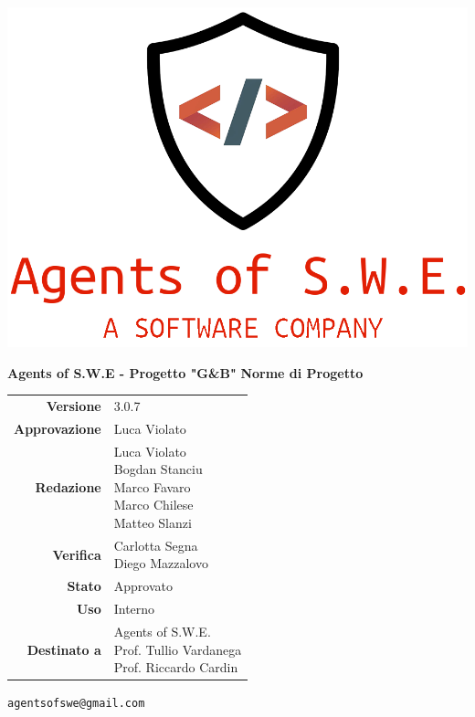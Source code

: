 


\begin{titlepage}
\thispagestyle{empty}

\begin{center}
\includegraphics[scale=0.3]{./images/logo.png} 

\large \textbf{Agents of S.W.E - Progetto "G\&B"}
\vfill
\Huge \textbf{Norme di Progetto}
\vfill
\large
\renewcommand{\arraystretch}{1.3}
\begin{tabular}{r|l}

\textbf{Versione} & 3.0.7\\

\textbf{Approvazione} & Luca Violato\\
\textbf{Redazione} & \parbox[t]{5cm}{Luca Violato\\Bogdan Stanciu\\Marco Favaro\\Marco Chilese \\ Matteo Slanzi}\\\
\textbf{Verifica} & \parbox[t]{5cm}{Carlotta Segna \\ Diego Mazzalovo}\\
\textbf{Stato} & Approvato\\
\textbf{Uso} & Interno\\
\textbf{Destinato a} & \parbox[t]{5cm}{Agents of S.W.E. \\Prof. Tullio Vardanega\\Prof. Riccardo Cardin}
\end{tabular}
\vfill
\small
\texttt{agentsofswe@gmail.com}
\end{center}
\end{titlepage}

